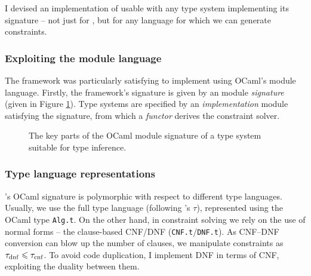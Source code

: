 I devised an implementation of \inference{} usable with any type system implementing its signature -- not just for \fabric{}, but for any language for which we can generate constraints.

\subsubsection{Exploiting the module language} The framework was particularly satisfying to implement using OCaml's module language. Firstly, the framework's signature is given by an module \emph{signature} (given in Figure \ref{fig:inference-signature}). Type systems are specified by an \emph{implementation} module satisfying the signature, from which a \emph{functor} derives the constraint solver.

\begin{figure}[p]
    \centering
    
    \caption{The key parts of the OCaml module signature of a type system suitable for type inference.}
    \label{fig:inference-signature}
\end{figure}

\subsubsection{Type language representations} \inference{}'s OCaml signature is polymorphic with respect to different type languages. 
Usually, we use the full type language (following \inference{}'s $\tau$), represented using the OCaml type \texttt{Alg.t}. On the other hand, in constraint solving we rely on the use of normal forms -- the clause-based CNF/DNF (\texttt{CNF.t}/\texttt{DNF.t}). As CNF--DNF conversion can blow up the number of clauses, we manipulate constraints as $\tau_\mathrm{dnf} \leqslant \tau_\mathrm{cnf}$. To avoid code duplication, I implement DNF in terms of CNF, exploiting the duality between them. 


